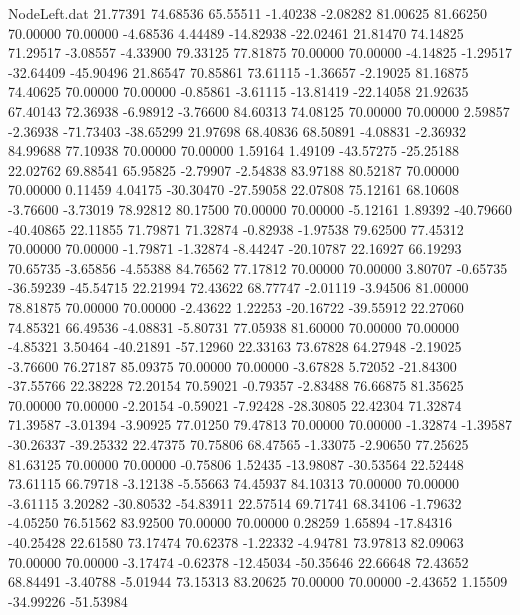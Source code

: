 \begin{filecontents}{NodeLeft.dat}
  21.77391   74.68536   65.55511    -1.40238   -2.08282   81.00625   81.66250   70.00000   70.00000   -4.68536    4.44489  -14.82938  -22.02461
  21.81470   74.14825   71.29517    -3.08557   -4.33900   79.33125   77.81875   70.00000   70.00000   -4.14825   -1.29517  -32.64409  -45.90496
  21.86547   70.85861   73.61115    -1.36657   -2.19025   81.16875   74.40625   70.00000   70.00000   -0.85861   -3.61115  -13.81419  -22.14058
  21.92635   67.40143   72.36938    -6.98912   -3.76600   84.60313   74.08125   70.00000   70.00000    2.59857   -2.36938  -71.73403  -38.65299
  21.97698   68.40836   68.50891    -4.08831   -2.36932   84.99688   77.10938   70.00000   70.00000    1.59164    1.49109  -43.57275  -25.25188
  22.02762   69.88541   65.95825    -2.79907   -2.54838   83.97188   80.52187   70.00000   70.00000    0.11459    4.04175  -30.30470  -27.59058
  22.07808   75.12161   68.10608    -3.76600   -3.73019   78.92812   80.17500   70.00000   70.00000   -5.12161    1.89392  -40.79660  -40.40865
  22.11855   71.79871   71.32874    -0.82938   -1.97538   79.62500   77.45312   70.00000   70.00000   -1.79871   -1.32874   -8.44247  -20.10787
  22.16927   66.19293   70.65735    -3.65856   -4.55388   84.76562   77.17812   70.00000   70.00000    3.80707   -0.65735  -36.59239  -45.54715
  22.21994   72.43622   68.77747    -2.01119   -3.94506   81.00000   78.81875   70.00000   70.00000   -2.43622    1.22253  -20.16722  -39.55912
  22.27060   74.85321   66.49536    -4.08831   -5.80731   77.05938   81.60000   70.00000   70.00000   -4.85321    3.50464  -40.21891  -57.12960
  22.33163   73.67828   64.27948    -2.19025   -3.76600   76.27187   85.09375   70.00000   70.00000   -3.67828    5.72052  -21.84300  -37.55766
  22.38228   72.20154   70.59021    -0.79357   -2.83488   76.66875   81.35625   70.00000   70.00000   -2.20154   -0.59021   -7.92428  -28.30805
  22.42304   71.32874   71.39587    -3.01394   -3.90925   77.01250   79.47813   70.00000   70.00000   -1.32874   -1.39587  -30.26337  -39.25332
  22.47375   70.75806   68.47565    -1.33075   -2.90650   77.25625   81.63125   70.00000   70.00000   -0.75806    1.52435  -13.98087  -30.53564
  22.52448   73.61115   66.79718    -3.12138   -5.55663   74.45937   84.10313   70.00000   70.00000   -3.61115    3.20282  -30.80532  -54.83911
  22.57514   69.71741   68.34106    -1.79632   -4.05250   76.51562   83.92500   70.00000   70.00000    0.28259    1.65894  -17.84316  -40.25428
  22.61580   73.17474   70.62378    -1.22332   -4.94781   73.97813   82.09063   70.00000   70.00000   -3.17474   -0.62378  -12.45034  -50.35646
  22.66648   72.43652   68.84491    -3.40788   -5.01944   73.15313   83.20625   70.00000   70.00000   -2.43652    1.15509  -34.99226  -51.53984

\end{filecontents}
